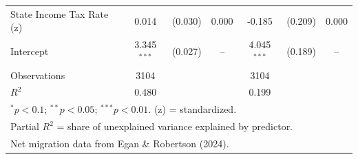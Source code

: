 \begin{table}[htbp!]
\begin{tabular}{lcccccc}
\quad State Income Tax Rate (z) & 0.014 & (0.030) & 0.000 & -0.185 & (0.209) & 0.000 \\
[3pt]
Intercept & 3.345$^{***}$ & (0.027) & -- & 4.045$^{***}$ & (0.189) & -- \\
\hline
Observations & 3104 & & & 3104 & & \\
$R^2$ & 0.480 & & & 0.199 & & \\
\hline\hline
\multicolumn{7}{l}{\footnotesize $^{*}p<0.1$; $^{**}p<0.05$; $^{***}p<0.01$. (z) = standardized.} \\
\multicolumn{7}{l}{\footnotesize Partial $R^2$ = share of unexplained variance explained by predictor.} \\
\multicolumn{7}{l}{\footnotesize Net migration data from Egan \& Robertson (2024).} \\
\end{tabular}
\end{table}
